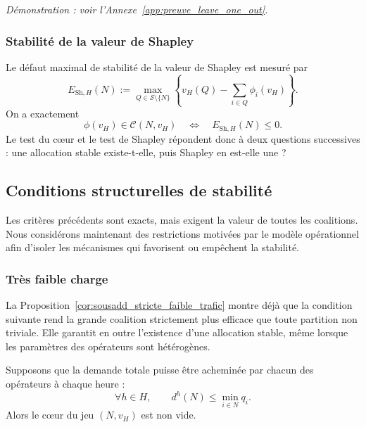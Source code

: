\emph{Démonstration : voir l'Annexe~\ref{app:preuve_leave_one_out}.}

\subsubsection{Stabilité de la valeur de Shapley}
\label{subsubsec:shapley}

Le défaut maximal de stabilité de la valeur de Shapley est mesuré par
\[
E_{\mathrm{Sh},H}(N)
:=
\max_{Q\in\mathcal S\setminus\{N\}}
\left\{
    v_H(Q)-\sum_{i\in Q}\phi_i(v_H)
\right\}.
\]
On a exactement
\begin{equation}
\label{eq:test_shapley_coeur}
    \phi(v_H)\in\mathcal C(N,v_H)
    \quad\Longleftrightarrow\quad
    E_{\mathrm{Sh},H}(N)\leqslant0.
\end{equation}
Le test du cœur et le test de Shapley répondent donc à deux questions
successives : une allocation stable existe-t-elle, puis Shapley en est-elle
une ?
\subsection{Conditions structurelles de stabilité}

Les critères précédents sont exacts, mais exigent la valeur de toutes les
coalitions. Nous considérons maintenant des restrictions motivées par le
modèle opérationnel afin d'isoler les mécanismes qui favorisent ou empêchent
la stabilité.

\subsubsection{Très faible charge}
\label{subsec:shapley_tres_faible_trafic}

La Proposition~\ref{cor:sousadd_stricte_faible_trafic} montre déjà que la
condition suivante rend la grande coalition strictement plus efficace que
toute partition non triviale. Elle garantit en outre l'existence d'une
allocation stable, même lorsque les paramètres des opérateurs sont
hétérogènes.

\begin{theorem}
\label{thm:capacite_coeur_non_vide}
\label{cor:capacite_coeur_agrege}
Supposons que la demande totale puisse être acheminée par chacun des
opérateurs à chaque heure :
\[
    \forall h\in H,\qquad
    d^h(N)\leqslant \min_{i\in N}q_i.
\]
Alors le cœur du jeu \((N,v_H)\) est non vide.
\end{theorem}

